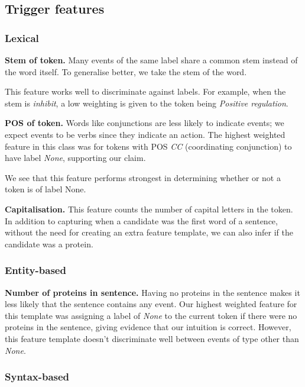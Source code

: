 \documentclass{article} %
\begin{document}
\subsection{Trigger features}

\subsubsection{Lexical}

\textbf{Stem of token.} Many events of the same label share a common stem instead of the word itself. To generalise better, we take the stem of the word. 

This feature works well to discriminate against labels. For example, when the stem is \emph{inhibit}, a low weighting is given to the token being \emph{Positive regulation}.


\textbf{POS of token.} \cite{1} Words like conjunctions are less likely to indicate events; we expect events to be verbs since they indicate an action. The highest weighted feature in this class was for tokens with POS \emph{CC} (coordinating conjunction) to have label \emph{None}, supporting our claim. 

We see that this feature performs strongest in determining whether or not a token is of label None.

\textbf{Capitalisation.} \cite{1} This feature counts the number of capital letters in the token. In addition to capturing when a candidate was the first word of a sentence, without the need for creating an extra feature template, we can also infer if the candidate was a protein.

\subsubsection{Entity-based}

\textbf{Number of proteins in sentence.} Having no proteins in the sentence makes it less likely that the sentence contains any event. Our highest weighted feature for this template was assigning a label of \emph{None} to the current token if there were no proteins in the sentence, giving evidence that our intuition is correct. However, this feature template doesn't discriminate well between events of type other than \emph{None}.

\subsubsection{Syntax-based}
\end{document}
